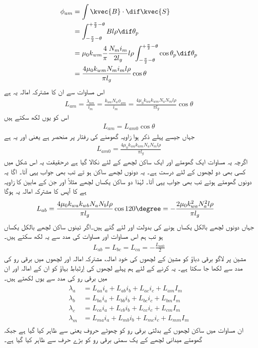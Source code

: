 \begin{gather}
\begin{aligned}
\phi_{am}&=\int \kvec{B} \cdot \dif \kvec{S}\\
&=\int_{-\frac{\pi}{2}-\theta}^{+\frac{\pi}{2}-\theta} B l \rho \dif \theta_p\\
&=\mu_0 k_{wm} \frac{4}{\pi}\frac{N_m i_m}{2 l_g} l \rho \int_{-\frac{\pi}{2}-\theta}^{+\frac{\pi}{2}-\theta} \cos \theta_p \dif \theta_p\\
&=\frac{4 \mu_0 k_{wm}  N_m i_m l \rho}{\pi l_g} \cos \theta
\end{aligned}
\end{gather}
اس مساوات سے ان کا مشترکہ امالہ  یہ ہے 
\begin{align}
L_{am}=\frac{\lambda_{am}}{i_m}=\frac{k_{wa} N_a \phi_{am}}{i_m}=\frac{4 \mu_0 k_{wa} k_{wm} N_a N_m l \rho}{\pi l_g} \cos \theta
\end{align}
اس کو یوں لکھ سکتے ہیں
\begin{align}
L_{am}=L_{am0} \cos \theta
\end{align}
جہاں جیسے پہلے ذکر ہوا زاویہ  گھومنے کی رفتار پر منحصر ہے یعنی   اور   یہ ہے
\begin{align}
L_{am0}=\frac{4 \mu_0 k_{wa} k_{wm} N_a N_m l \rho}{\pi l_g} 
\end{align}
اگرچہ یہ مساوات ایک گھومتے اور ایک ساکن لچھے کے لئے نکالا گیا ہے درحقیقت یہ اس شکل میں کسی بھی دو لچھوں کے لئے درست ہے۔ یہ دونوں لچھے ساکن ہو تے تب بھی جواب یہی آتا۔ اگا یہ دونوں گھومتے ہوتے تب بھی جواب یہی آتا۔ لہٰذا دو ساکن  یکساں لچھے مثلاً  اور  جن کے مابین  کا زاویہ ہے کا آپس کا مشترکہ امالہ یہ ہوگا
\begin{align}
L_{ab}&=\frac{4 \mu_0 k_{wa} k_{wb} N_a N_b l \rho}{\pi l_g} \cos 120\degree=-\frac{2 \mu_0 k_{wa}^2  N_a^2 l \rho}{\pi l_g}
\end{align}
جہاں دونوں لچھے بالکل یکساں ہونے کی بدولت   اور  لئے گئے ہیں۔اگر تینوں ساکن لچھے بالکل یکساں ہو تب ہم اس مساوات اور مساوات کی مدد سے یہ لکھ سکتے ہیں۔ 
\begin{align}
L_{ab}=L_{bc}=L_{ca}=-\frac{L_{aa0}}{2}
\end{align}
%
مشین پر لاگو برقی دباؤ کو مشین کے لچھوں کی خود امالہ، مشترکہ امالہ اور لچھوں میں برقی رو کی مدد سے لکھا جا سکتا ہے۔ یہ کرنے کے لئے ہم پہلے  لچھوں کی اِرتَباطِ بہاؤ  کو ان کے امالہ اور ان میں برقی رو کی مدد سے یوں لکھتے ہیں۔
\begin{gather}
\begin{aligned}
\lambda_a&=L_{aa} i_a+L_{ab} i_b +L_{ac} i_c+L_{am} I_m\\
\lambda_b&=L_{ba} i_a+L_{bb} i_b +L_{bc} i_c+L_{bm} I_m\\
\lambda_c&=L_{ca} i_a+L_{cb} i_b +L_{cc} i_c+L_{cm} I_m\\
\lambda_m&=L_{ma} i_a+L_{mb} i_b +L_{mc} i_c+L_{mm} I_m
\end{aligned}
\end{gather}
ان مساوات میں ساکن لچھوں کے بدلتی برقی رو  کو چھوٹے حروف یعنی  سے ظاہر کیا گیا ہے جبکہ گھومتے میدانی لچھے کے یک سمتی برقی رو کو بڑے حرف   سے ظاہر کیا گیا ہے۔

